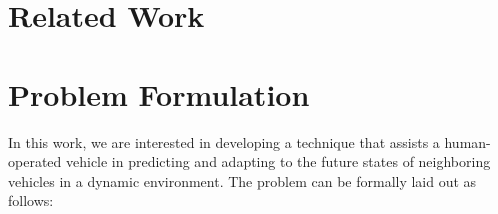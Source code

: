 \documentclass[conference]{IEEEtran}
\begin{document}
    

\section{Related Work}

    
    
    
    
    
\section{Problem Formulation}
 
    In this work, we are interested in developing a technique that assists a human-operated vehicle in predicting and adapting to the future states of neighboring vehicles in a dynamic environment. The problem can be formally laid out as follows:
    
\end{document}
